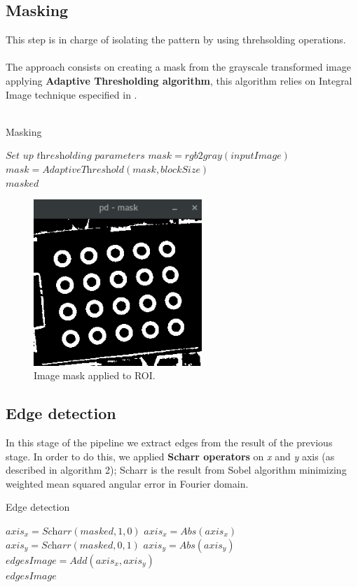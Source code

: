 \documentclass[journal]{IEEEtran}
\begin{document}
\subsection{ Masking }
This step is in charge of isolating the pattern by using threhsolding operations.
\\
\\
The approach consists on creating a mask from the grayscale transformed image applying \textbf{Adaptive Thresholding algorithm}, this algorithm relies on Integral Image technique especified in \cite{IntegralImageThresholding}.
\\
\\
\begin{algorithm}
\caption{Masking}
\label{alg:mask2}
\begin{algorithmic}[1]
\State $\textit{Set up thresholding parameters}$
\State $mask   = \textit{rgb2gray}( inputImage )$
\State $mask   = \textit{AdaptiveThreshold}(mask, blockSize)$\\
\Return $masked$
\end{algorithmic}
\end{algorithm}

\begin{figure}[H]
\centering
\includegraphics[width=2.5in]{_img/img_report2_mask.png}
\caption{Image mask applied to ROI.}
\end{figure}

\subsection{Edge detection}
In this stage of the pipeline we extract edges from the result of the previous stage. In order to do this, we applied \textbf{Scharr operators} on \textit{x} and \textit{y} axis (as described in algorithm 2); Scharr is the result from Sobel algorithm minimizing weighted mean squared angular error in Fourier domain.
\begin{algorithm}
\caption{Edge detection}
\begin{algorithmic}[1]
\State $axis_x   = \textit{Scharr}(masked, 1, 0)$
\State $axis_x   = \textit{Abs}(axis_x)$
\State $axis_y   = \textit{Scharr}(masked, 0, 1)$
\State $axis_y   = \textit{Abs}(axis_y)$
\State $edgesImage   = \textit{Add}(axis_x, axis_y)$ \\
\Return $edgesImage$
\end{algorithmic}
\end{algorithm}
\end{document}
